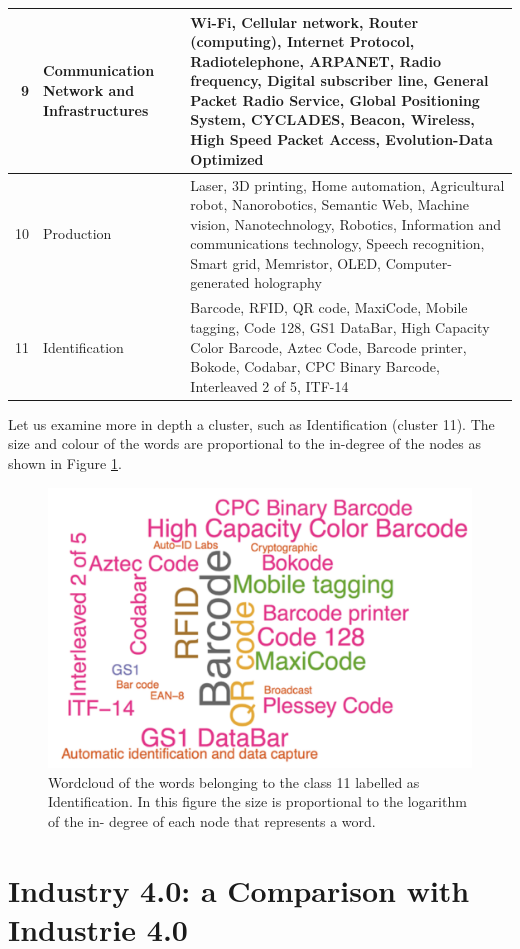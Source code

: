 \documentclass[]{book}
\begin{document}
\begin{tabular}{r|l|l}
\hline
9 & Communication Network and Infrastructures & Wi-Fi, Cellular network, Router (computing), Internet Protocol, Radiotelephone, ARPANET, Radio frequency, Digital subscriber line, General Packet Radio Service, Global Positioning System, CYCLADES, Beacon, Wireless, High Speed Packet Access, Evolution-Data Optimized\\
\hline
10 & Production & Laser, 3D printing, Home automation, Agricultural robot, Nanorobotics, Semantic Web, Machine vision, Nanotechnology, Robotics, Information and communications technology, Speech recognition, Smart grid, Memristor, OLED, Computer-generated holography\\
\hline
11 & Identification & Barcode, RFID, QR code, MaxiCode, Mobile tagging, Code 128, GS1 DataBar, High Capacity Color Barcode, Aztec Code, Barcode printer, Bokode, Codabar, CPC Binary Barcode, Interleaved 2 of 5, ITF-14\\
\hline
\end{tabular}

Let us examine more in depth a cluster, such as Identification (cluster
11). The size and colour of the words are proportional to the in-degree
of the nodes as shown in Figure \ref{fig:identificationspec}.

\begin{figure}

{\centering \includegraphics[width=0.7\linewidth]{_bookdown_files/figures/wctech} 

}

\caption{ Wordcloud of the words belonging to the class 11 labelled as Identification. In this figure the size is proportional to the logarithm of the in- degree of each node that represents a word.}\label{fig:identificationspec}
\end{figure}

\section{Industry 4.0: a Comparison with Industrie
4.0}\label{industry-4.0-a-comparison-with-industrie-4.0}
\end{document}
